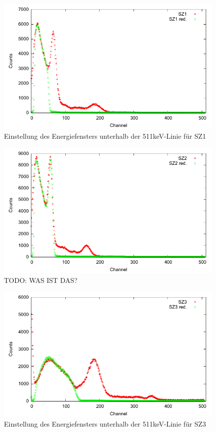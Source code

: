 \begin{figure}
 \includegraphics[width=\textwidth]{Graphen/3er/red-spektrum-sz1.pdf}
 \caption{Einstellung des Energiefensters unterhalb der 511keV-Linie für SZ1}
\end{figure}

\begin{figure}
 \includegraphics[width=\textwidth]{Graphen/3er/red-spektrum-sz2.pdf}
 \caption{TODO: WAS IST DAS?}
\end{figure}

\begin{figure}
 \includegraphics[width=\textwidth]{Graphen/3er/red-spektrum-sz3.pdf}
 \caption{Einstellung des Energiefensters unterhalb der 511keV-Linie für SZ3}
\end{figure}

